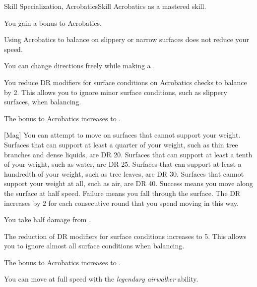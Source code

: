     \begin{feat}{Skill Specialization, Acrobatics}{Skill}
        \featpre Acrobatics as a mastered skill.
        
         You gain a  bonus to Acrobatics.

         Using Acrobatics to balance on slippery or narrow surfaces does not reduce your speed.

         You can change directions freely while making a .

         You reduce DR modifiers for surface conditions on Acrobatics checks to balance by 2.
        This allows you to ignore minor surface conditions, such as slippery surfaces, when balancing.

         The bonus to Acrobatics increases to .

        [Mag] You can attempt to move on surfaces that cannot support your weight.
        Surfaces that can support at least a quarter of your weight, such as thin tree branches and dense liquids, are DR 20.
        Surfaces that can support at least a tenth of your weight, such as water, are DR 25.
        Surfaces that can support at least a hundredth of your weight, such as tree leaves, are DR 30.
        Surfaces that cannot support your weight at all, such as air, are DR 40.
        Success means you move along the surface at half speed.
        Failure means you fall through the surface.
        The DR increases by 2 for each consecutive round that you spend moving in this way.

         You take half damage from .

         The reduction of DR modifiers for surface conditions increases to 5.
        This allows you to ignore almost all surface conditions when balancing.

         The bonus to Acrobatics increases to .

         You can move at full speed with the \textit{legendary airwalker} ability.
    \end{feat}

